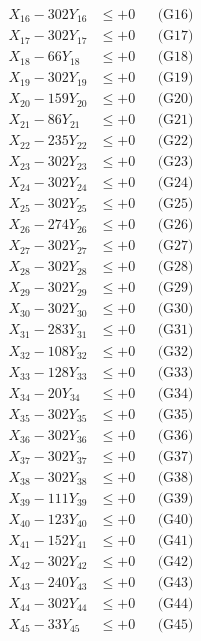 \documentclass[a4paper,10pt]{article}
\begin{document}
{\begin{align}
X_{16} - 302Y_{16} &\leq +0 && \text{(G16)} \\
X_{17} - 302Y_{17} &\leq +0 && \text{(G17)} \\
X_{18} - 66Y_{18} &\leq +0 && \text{(G18)} \\
X_{19} - 302Y_{19} &\leq +0 && \text{(G19)} \\
X_{20} - 159Y_{20} &\leq +0 && \text{(G20)} \\
\allowbreak
X_{21} - 86Y_{21} &\leq +0 && \text{(G21)} \\
X_{22} - 235Y_{22} &\leq +0 && \text{(G22)} \\
X_{23} - 302Y_{23} &\leq +0 && \text{(G23)} \\
X_{24} - 302Y_{24} &\leq +0 && \text{(G24)} \\
X_{25} - 302Y_{25} &\leq +0 && \text{(G25)} \\
X_{26} - 274Y_{26} &\leq +0 && \text{(G26)} \\
X_{27} - 302Y_{27} &\leq +0 && \text{(G27)} \\
X_{28} - 302Y_{28} &\leq +0 && \text{(G28)} \\
X_{29} - 302Y_{29} &\leq +0 && \text{(G29)} \\
X_{30} - 302Y_{30} &\leq +0 && \text{(G30)} \\
\allowbreak
X_{31} - 283Y_{31} &\leq +0 && \text{(G31)} \\
X_{32} - 108Y_{32} &\leq +0 && \text{(G32)} \\
X_{33} - 128Y_{33} &\leq +0 && \text{(G33)} \\
X_{34} - 20Y_{34} &\leq +0 && \text{(G34)} \\
X_{35} - 302Y_{35} &\leq +0 && \text{(G35)} \\
X_{36} - 302Y_{36} &\leq +0 && \text{(G36)} \\
X_{37} - 302Y_{37} &\leq +0 && \text{(G37)} \\
X_{38} - 302Y_{38} &\leq +0 && \text{(G38)} \\
X_{39} - 111Y_{39} &\leq +0 && \text{(G39)} \\
X_{40} - 123Y_{40} &\leq +0 && \text{(G40)} \\
\allowbreak
X_{41} - 152Y_{41} &\leq +0 && \text{(G41)} \\
X_{42} - 302Y_{42} &\leq +0 && \text{(G42)} \\
X_{43} - 240Y_{43} &\leq +0 && \text{(G43)} \\
X_{44} - 302Y_{44} &\leq +0 && \text{(G44)} \\
X_{45} - 33Y_{45} &\leq +0 && \text{(G45)} \\

\end{align}}
\end{document}
